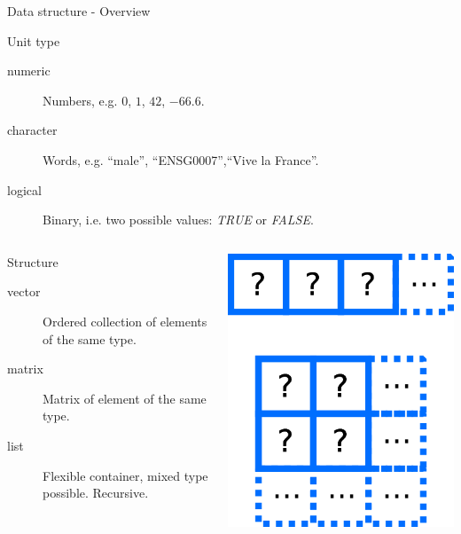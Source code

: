 \documentclass[10pt]{beamer}
\begin{document}
\begin{frame}{Data structure - Overview}
  \begin{block}{Unit type}
    \begin{description}
      \item[numeric] Numbers, e.g. $0$, $1$, $42$, $-66.6$.
      \item[character] Words, e.g. ``male'', ``ENSG0007'',``Vive la France''.
      \item[logical] Binary, i.e. two possible values: {\it TRUE} or {\it FALSE}.
    \end{description}
  \end{block}
  \begin{columns}
    \begin{column}{.8\textwidth}
      \begin{block}{Structure}
        \begin{description}
        \item[vector] Ordered collection of elements of the same type.
        \item[matrix] Matrix of element of the same type.
        \item[list] Flexible container, mixed type possible. Recursive.
        \end{description}
      \end{block}      
    \end{column}
    \begin{column}{.2\textwidth}
      \includegraphics[width=\linewidth]{imgs/vectorMatrixCartoon.png}

\end{column}
\end{columns}
\end{frame}
\end{document}
